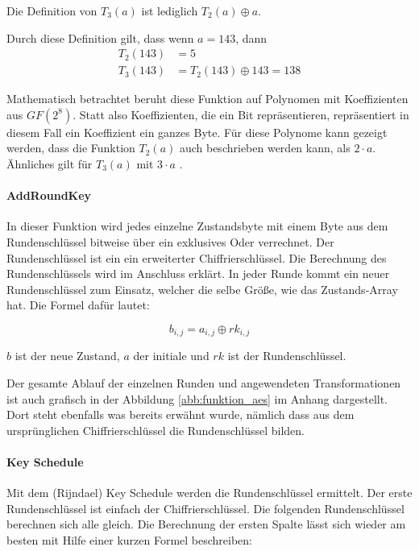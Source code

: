     Die Definition von $T_3(a)$ ist lediglich $T_2(a) \oplus a$.
    
    Durch diese Definition gilt, dass wenn $a = 143$, dann
    \begin{equation*}
     \begin{aligned}
     T_2(143) &= 5 \\
     T_3(143) &= T_2(143) \oplus 143 = 138
     \end{aligned}
    \end{equation*}
    
    Mathematisch betrachtet beruht diese Funktion auf Polynomen mit Koeffizienten aus $GF(2^8)$. Statt also
    Koeffizienten, die ein Bit repräsentieren, repräsentiert in diesem Fall ein Koeffizient ein ganzes Byte. Für diese
    Polynome kann gezeigt werden, dass die Funktion $T_2(a)$ auch beschrieben werden kann, als $2 \cdot a$.
    Ähnliches gilt für $T_3(a)$ mit $3 \cdot a$ \cite{schmeh07}.
   
  \paragraph{AddRoundKey}
   In dieser Funktion wird jedes einzelne Zustandsbyte mit einem Byte aus dem Rundenschlüssel bitweise über
   ein exklusives Oder verrechnet. Der Rundenschlüssel ist ein ein erweiterter Chiffrierschlüssel. Die Berechnung
   des Rundenschlüssels wird im Anschluss erklärt. In jeder Runde kommt ein neuer Rundenschlüssel zum
   Einsatz, welcher die selbe Größe, wie das Zustands-Array hat. Die Formel dafür lautet:
   
   \begin{equation*}
    b_{i,j} = a_{i,j} \oplus rk_{i,j}
   \end{equation*}
   
   $b$ ist der neue Zustand, $a$ der initiale und $rk$ ist der Rundenschlüssel.
   
   Der gesamte Ablauf der einzelnen Runden und angewendeten Transformationen ist auch grafisch in der
   Abbildung \ref{abb:funktion_aes} im Anhang dargestellt. Dort steht ebenfalls was bereits erwähnt wurde,
   nämlich dass aus dem ursprünglichen Chiffrierschlüssel die Rundenschlüssel bilden.
   
  \paragraph{Key Schedule}
   Mit dem (Rijndael) Key Schedule werden die Rundenschlüssel ermittelt. Der erste Rundenschlüssel ist
   einfach der Chiffrierschlüssel. Die folgenden Rundenschlüssel berechnen sich alle gleich. Die Berechnung der
   ersten Spalte lässt sich wieder am besten mit Hilfe einer kurzen Formel beschreiben:
   
